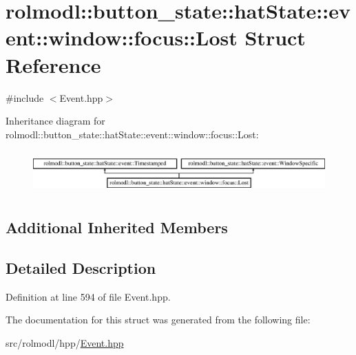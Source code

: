 \hypertarget{structrolmodl_1_1button__state_1_1hat_state_1_1event_1_1window_1_1focus_1_1_lost}{}\section{rolmodl\+::button\+\_\+state\+::hat\+State\+::event\+::window\+::focus\+::Lost Struct Reference}
\label{structrolmodl_1_1button__state_1_1hat_state_1_1event_1_1window_1_1focus_1_1_lost}


{\ttfamily \#include $<$Event.\+hpp$>$}

Inheritance diagram for rolmodl\+::button\+\_\+state\+::hat\+State\+::event\+::window\+::focus\+::Lost\+:\begin{figure}[H]
\begin{center}
\leavevmode
\includegraphics[height=1.666667cm]{structrolmodl_1_1button__state_1_1hat_state_1_1event_1_1window_1_1focus_1_1_lost}
\end{center}
\end{figure}
\subsection*{Additional Inherited Members}


\subsection{Detailed Description}


Definition at line 594 of file Event.\+hpp.



The documentation for this struct was generated from the following file\+:\begin{DoxyCompactItemize}
\item 
src/rolmodl/hpp/\mbox{\hyperlink{_event_8hpp}{Event.\+hpp}}\end{DoxyCompactItemize}
